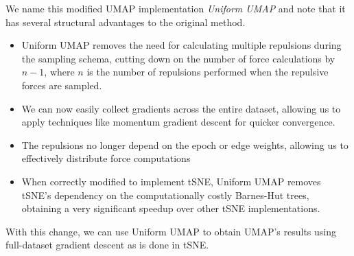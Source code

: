 \documentclass{article}
\theoremstyle{definition}
\begin{document}
We name this modified UMAP implementation \textit{Uniform UMAP} and note that it has several structural advantages to the original method. 
\begin{itemize}
        \item Uniform UMAP removes the need for calculating multiple repulsions during the sampling schema, cutting down on the number of force calculations by $n-1$, where $n$ is the number of repulsions performed when the repulsive forces are sampled.
        \item We can now easily collect gradients across the entire dataset, allowing us to apply techniques like momentum gradient descent for quicker convergence.
        \item The repulsions no longer depend on the epoch or edge weights, allowing us to effectively distribute force computations
        \item When correctly modified to implement tSNE, Uniform UMAP removes tSNE's dependency on the computationally costly Barnes-Hut trees, obtaining a very
            significant speedup over other tSNE implementations.
\end{itemize}

With this change, we can use Uniform UMAP to obtain UMAP's results using full-dataset gradient descent as is done in tSNE.


\end{document}
